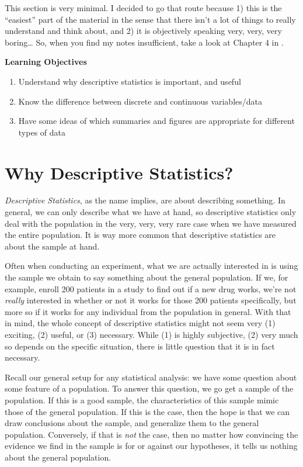 \documentclass[]{book}
\theoremstyle{definition}
\theoremstyle{definition}
\theoremstyle{definition}
\theoremstyle{remark}
\begin{document}
This section is very minimal. I decided to go that route because 1) this is the ``easiest'' part of the material in the sense that there isn't a lot of things to really understand and think about, and 2) it is objectively speaking very, very, very boring\ldots{} So, when you find my notes insufficient, take a look at Chapter 4 in \citep{ls}.

\textbf{Learning Objectives}

\begin{enumerate}
\def\labelenumi{\arabic{enumi}.}
\item
  Understand why descriptive statistics is important, and useful
\item
  Know the difference between discrete and continuous variables/data
\item
  Have some ideas of which summaries and figures are appropriate for different types of data
\end{enumerate}

\hypertarget{why-descriptive-statistics}{%
\chapter{Why Descriptive Statistics?}\label{why-descriptive-statistics}}

\emph{Descriptive Statistics}, as the name implies, are about describing something. In general, we can only describe what we have at hand, so descriptive statistics only deal with the population in the very, very, very rare case when we have measured the entire population. It is way more common that descriptive statistics are about the sample at hand.

Often when conducting an experiment, what we are actually interested in is using the sample we obtain to say something about the general population. If we, for example, enroll 200 patients in a study to find out if a new drug works, we're not \emph{really} interested in whether or not it works for those 200 patients specifically, but more so if it works for any individual from the population in general. With that in mind, the whole concept of descriptive statistics might not seem very (1) exciting, (2) useful, or (3) necessary. While (1) is highly subjective, (2) very much so depends on the specific situation, there is little question that it is in fact necessary.

Recall our general setup for any statistical analysis: we have some question about some feature of a population. To answer this question, we go get a sample of the population. If this is a good sample, the characteristics of this sample mimic those of the general population. If this is the case, then the hope is that we can draw conclusions about the sample, and generalize them to the general population. Conversely, if that is \emph{not} the case, then no matter how convincing the evidence we find in the sample is for or against our hypotheses, it tells us nothing about the general population.
\end{document}
